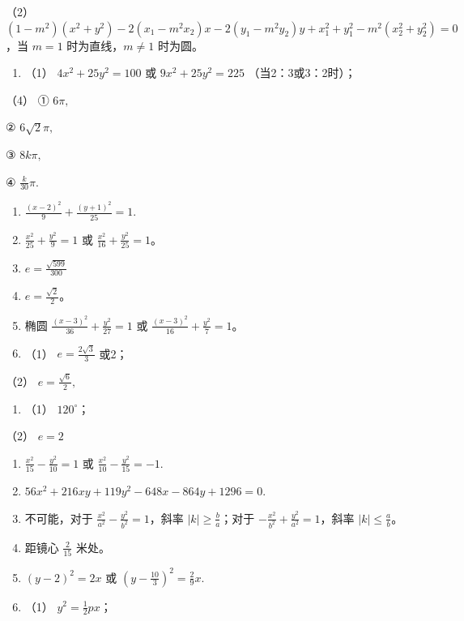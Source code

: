 （2）
\((1 - m^2)(x^2 + y^2) - 2(x_1 - m^2x_2)x - 2(y_1 - m^2y_2)y + x_1^2 + y_1^2 - m^2(x_2^2 + y_2^2) = 0\)，当
\(m = 1\) 时为直线，\(m \neq 1\) 时为圆。

\begin{enumerate}
\def\labelenumi{\arabic{enumi}.}
\setcounter{enumi}{16}
\tightlist
\item
  （1） \(4x^{2} + 25y^{2} = 100\) 或 \(9x^{2} + 25y^{2} = 225\)
  （当2：3或3：2时）；
\end{enumerate}

（4） ① \(6\pi,\)

② \(6\sqrt{2}\pi,\)

③ \(8k\pi,\)

④ \(\frac{k}{30}\pi.\)

\begin{enumerate}
\def\labelenumi{\arabic{enumi}.}
\setcounter{enumi}{17}
\item
  \(\frac{(x - 2)^2}{9} +\frac{(y + 1)^2}{25} = 1.\)
\item
  \(\frac{x^2}{25} + \frac{y^2}{9} = 1\) 或
  \(\frac{x^2}{16} + \frac{y^2}{25} = 1\)。
\item
  \(e = \frac{\sqrt{599}}{300}\)
\item
  \(e = \frac{\sqrt{2}}{2}\)。
\item
  椭圆 \(\frac{(x - 3)^2}{36} + \frac{y^2}{27} = 1\) 或
  \(\frac{(x - 3)^2}{16} + \frac{y^2}{7} = 1\)。
\item
  （1） \(e = \frac{2\sqrt{3}}{3}\) 或2；
\end{enumerate}

（2） \(e = \frac{\sqrt{6}}{2},\)

\begin{enumerate}
\def\labelenumi{\arabic{enumi}.}
\setcounter{enumi}{25}
\tightlist
\item
  （1） \(120^{\circ}\)；
\end{enumerate}

（2） \(e = 2\)

\begin{enumerate}
\def\labelenumi{\arabic{enumi}.}
\setcounter{enumi}{27}
\item
  \(\frac{x^2}{15} -\frac{y^2}{10} = 1\) 或
  \(\frac{x^2}{10} -\frac{y^2}{15} = -1.\)
\item
  \(56x^{2} + 216xy + 119y^{2} - 648x - 864y + 1296 = 0.\)
\item
  不可能，对于 \(\frac{x^2}{a^2} - \frac{y^2}{b^2} = 1\)，斜率
  \(|k| \geqslant \frac{b}{a}\)；对于
  \(-\frac{x^2}{b^2} + \frac{y^2}{a^2} = 1\)，斜率
  \(|k| \leqslant \frac{a}{b}\)。
\item
  距镜心 \(\frac{2}{15}\) 米处。
\item
  \((y - 2)^{2} = 2x\) 或
  \(\left(y - \frac{10}{3}\right)^{2} = \frac{2}{9} x.\)
\item
  （1） \(y^{2} = \frac{1}{2} px\)；
\end{enumerate}

